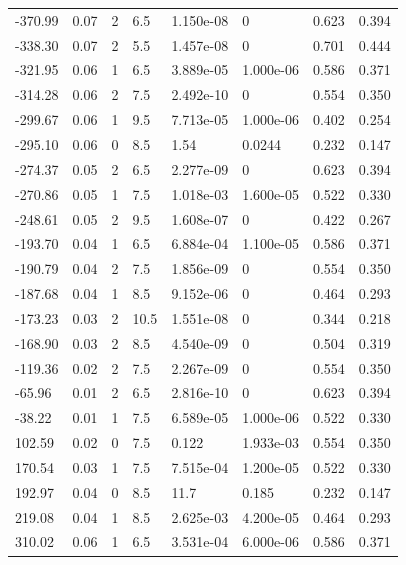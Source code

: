 \documentclass[preview]{standalone}
\begin{document}
{{\begin{tabular}{L{1.2cm}C{1.2cm} C{0.3cm}C{0.5cm} C{1.4cm}C{1.4cm} C{1.4cm}C{1.4cm}}
  -370.99  &  0.07  & 2     & 6.5 &  1.150e-08  & 0  & 0.623 &  0.394   \\ 
  -338.30  &  0.07  & 2     & 5.5 &  1.457e-08  & 0  & 0.701 &  0.444   \\ 
  -321.95  &  0.06  & 1     & 6.5 &  3.889e-05  & 1.000e-06  & 0.586 &  0.371   \\ 
  -314.28  &  0.06  & 2     & 7.5 &  2.492e-10  & 0  & 0.554 &  0.350   \\ 
  -299.67  &  0.06  & 1     & 9.5 &  7.713e-05  & 1.000e-06  & 0.402 &  0.254   \\ 
  -295.10  &  0.06  & 0     & 8.5 &  1.54  & 0.0244  & 0.232 &  0.147   \\ 
  -274.37  &  0.05  & 2     & 6.5 &  2.277e-09  & 0  & 0.623 &  0.394   \\ 
  -270.86  &  0.05  & 1     & 7.5 &  1.018e-03  & 1.600e-05  & 0.522 &  0.330   \\ 
  -248.61  &  0.05  & 2     & 9.5 &  1.608e-07  & 0  & 0.422 &  0.267   \\ 
  -193.70  &  0.04  & 1     & 6.5 &  6.884e-04  & 1.100e-05  & 0.586 &  0.371   \\ 
  -190.79  &  0.04  & 2     & 7.5 &  1.856e-09  & 0  & 0.554 &  0.350   \\ 
  -187.68  &  0.04  & 1     & 8.5 &  9.152e-06  & 0  & 0.464 &  0.293   \\ 
  -173.23  &  0.03  & 2     & 10.5 &  1.551e-08  & 0  & 0.344 &  0.218   \\ 
  -168.90  &  0.03  & 2     & 8.5 &  4.540e-09  & 0  & 0.504 &  0.319   \\ 
  -119.36  &  0.02  & 2     & 7.5 &  2.267e-09  & 0  & 0.554 &  0.350   \\ 
  -65.96  &  0.01  & 2     & 6.5 &  2.816e-10  & 0  & 0.623 &  0.394   \\ 
  -38.22  &  0.01  & 1     & 7.5 &  6.589e-05  & 1.000e-06  & 0.522 &  0.330   \\ 
  102.59  &  0.02  & 0     & 7.5 &  0.122  & 1.933e-03  & 0.554 &  0.350   \\ 
  170.54  &  0.03  & 1     & 7.5 &  7.515e-04  & 1.200e-05  & 0.522 &  0.330   \\ 
  192.97  &  0.04  & 0     & 8.5 &  11.7  & 0.185  & 0.232 &  0.147   \\ 
  219.08  &  0.04  & 1     & 8.5 &  2.625e-03  & 4.200e-05  & 0.464 &  0.293   \\ 
  310.02  &  0.06  & 1     & 6.5 &  3.531e-04  & 6.000e-06  & 0.586 &  0.371   \\ 

\end{tabular}}}
\end{document}

